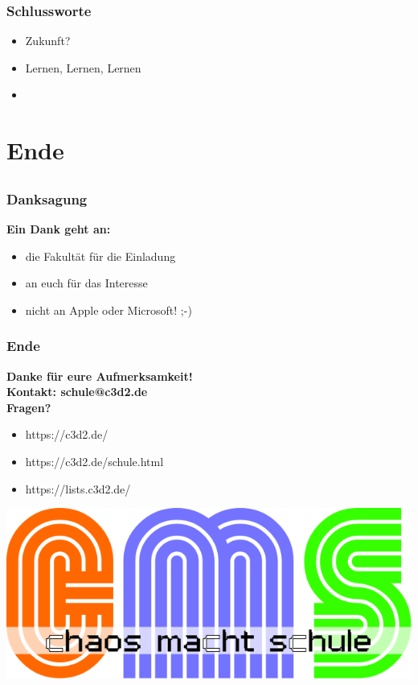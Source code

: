 \documentclass[12pt]{beamer}
\begin{document}
\begin{frame}
	\frametitle{Schlussworte}
	\begin{itemize}
		\item<1-> Zukunft?
		\item<2-> Lernen, Lernen, Lernen
		\item<3->  
	\end{itemize}
\end{frame}

\section{Ende}
	\subsection{}

\begin{frame}
	\frametitle{Danksagung}
	\begin{center}
		\textbf{Ein Dank geht an:}
		\begin{itemize}
			\item<1-> die Fakultät für die Einladung
			\item<2-> an euch für das Interesse
			\item<2-> nicht an Apple oder Microsoft! ;-)
		\end{itemize}
	\end{center}
\end{frame}
  
\begin{frame}
	\frametitle{Ende}
	\begin{center}
		\textbf{Danke für eure Aufmerksamkeit!} \\
		\textbf{Kontakt: schule@c3d2.de} \\
		\textbf{Fragen?} 
	\end{center}
	\begin{itemize}
		\item<1-> https://c3d2.de/
		\item<2-> https://c3d2.de/schule.html
		\item<4-> https://lists.c3d2.de/  
	\end{itemize}
\end{frame}

\begin{frame}
	\begin{center}
    	\includegraphics[height=0.5\textheight]{img//cms-text.png}
    \end{center}
\end{frame}
\end{document}
